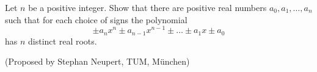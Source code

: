Let $n$ be a positive integer. Show that there are positive real numbers $a_0, a_1, \dots, a_n$ such that for each choice of signs the polynomial
$$\pm a_nx^n\pm a_{n-1}x^{n-1} \pm \dots \pm a_1x \pm a_0$$has $n$ distinct real roots.

(Proposed by Stephan Neupert, TUM, München)